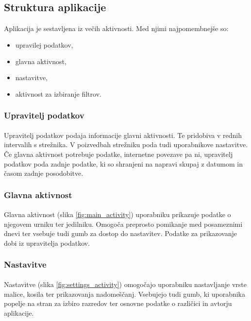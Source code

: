 \subsection{Struktura aplikacije}
\paragraph{}Aplikacija je sestavljena iz večih aktivnosti. Med njimi najpomembnejše so:
\begin{itemize}
  \setlength\itemsep{0em}
  \item upravilej podatkov,
  \item glavna aktivnost,
  \item nastavitve,
  \item aktivnost za izbiranje filtrov.
\end{itemize}

\subsubsection{Upravitelj podatkov}
\paragraph{}Upravitelj podatkov podaja informacije glavni aktivnosti. Te pridobiva v rednih intervalih s strežnika. V poizvedbah strežniku poda tudi uporabnikove nastavitve. Če glavna aktivnost potrebuje podatke, internetne povezave pa ni, upravitelj podatkov poda zadnje podatke, ki so shranjeni na napravi skupaj z datumom in časom zadnje posodobitve.

\subsubsection{Glavna aktivnost}
\paragraph{}Glavna aktivnost (slika \ref{fig:main_activity}) uporabniku prikazuje podatke o njegovem urniku ter jedilniku. Omogoča preprosto pomikanje med posameznimi dnevi ter vsebuje tudi gumb za dostop do nastavitev. Podatke za prikazovanje dobi iz upravitelja podatkov.

\subsubsection{Nastavitve}
\paragraph{}Nastavitve (slika \ref{fig:settings_activity}) omogočajo uporabniku nastavljanje vrste malice, kosila ter prikazovanja nadomeščanj. Vsebujejo tudi gumb, ki uporabnika popelje na stran za izbiro razredov ter osnovne podatke o različici in avtorju aplikacije.

